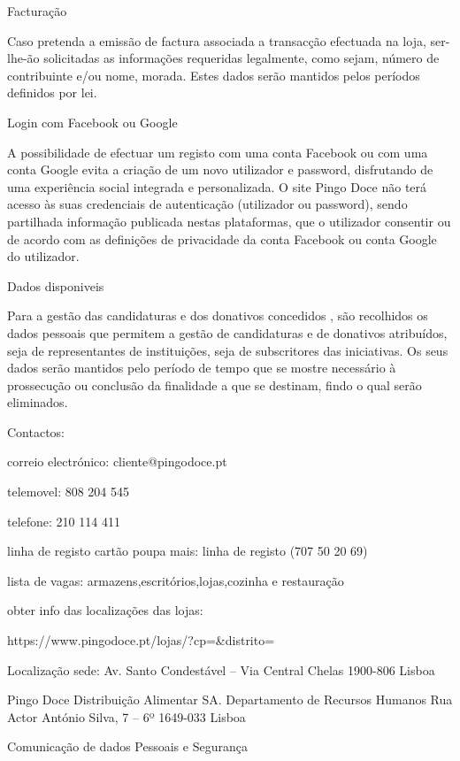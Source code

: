 Facturação

Caso pretenda a emissão de factura associada a transacção efectuada na loja, ser-lhe-ão solicitadas as informações requeridas legalmente, como sejam, número de contribuinte e/ou nome, morada. Estes dados serão mantidos pelos períodos definidos por lei.



Login com Facebook ou Google

A possibilidade de efectuar um registo com uma conta Facebook ou com uma conta Google evita a criação de um novo utilizador e password, disfrutando de uma experiência social integrada e personalizada. O site Pingo Doce não terá acesso às suas credenciais de autenticação (utilizador ou password), sendo partilhada informação publicada nestas plataformas, que o utilizador consentir ou de acordo com as definições de privacidade da conta Facebook ou conta Google do utilizador.



Dados disponiveis

Para a gestão das candidaturas e dos donativos concedidos , são recolhidos os dados pessoais que permitem a gestão de candidaturas e de donativos atribuídos, seja de representantes de instituições, seja de subscritores das iniciativas. Os seus dados serão mantidos pelo período de tempo que se mostre necessário à prossecução ou conclusão da finalidade a que se destinam, findo o qual serão eliminados.



Contactos:


correio electrónico: cliente@pingodoce.pt

telemovel: 808 204 545 

telefone: 210 114 411

linha de registo cartão poupa mais:  linha de registo (707 50 20 69)

lista de vagas: armazens,escritórios,lojas,cozinha e restauração

obter info das localizações das lojas:

https://www.pingodoce.pt/lojas/?cp=\&distrito=

Localização sede: Av. Santo Condestável – Via Central Chelas 1900-806 Lisboa

Pingo Doce Distribuição Alimentar SA.
Departamento de Recursos Humanos
Rua Actor António Silva, 7 – 6º
1649-033 Lisboa



Comunicação de dados Pessoais e Segurança


